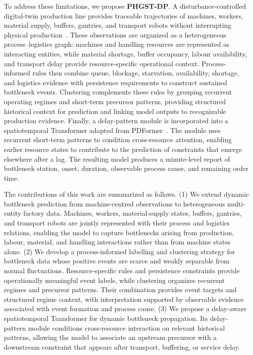 \documentclass[a4paper,fleqn]{cas-dc}
\begin{document}
To address these limitations, we propose \textbf{PHGST-DP}. A disturbance-controlled digital-twin production line provides traceable trajectories of machines, workers, material supply, buffers, gantries, and transport robots without interrupting physical production~\cite{lu2020digital,isaacsim2026,xue2026safe}. These observations are organized as a heterogeneous process--logistics graph: machines and handling resources are represented as interacting entities, while material shortage, buffer occupancy, labour availability, and transport delay provide resource-specific operational context. Process-informed rules then combine queue, blockage, starvation, availability, shortage, and logistics evidence with persistence requirements to construct sustained bottleneck events. Clustering complements these rules by grouping recurrent operating regimes and short-term precursor patterns, providing structured historical context for prediction and linking model outputs to recognizable production evidence. Finally, a delay-pattern module is incorporated into a spatiotemporal Transformer adapted from PDFormer~\cite{jiang2023pdformer}. The module uses recurrent short-term patterns to condition cross-resource attention, enabling earlier resource states to contribute to the prediction of constraints that emerge elsewhere after a lag. The resulting model produces a minute-level report of bottleneck station, onset, duration, observable process cause, and remaining order time.


The contributions of this work are summarized as follows. (1) We extend dynamic bottleneck prediction from machine-centred observations to heterogeneous multi-entity factory data. Machines, workers, material-supply states, buffers, gantries, and transport robots are jointly represented with their process and logistics relations, enabling the model to capture bottlenecks arising from production, labour, material, and handling interactions rather than from machine states alone. (2) We develop a process-informed labelling and clustering strategy for bottleneck data whose positive events are scarce and weakly separable from normal fluctuations. Resource-specific rules and persistence constraints provide operationally meaningful event labels, while clustering organizes recurrent regimes and precursor patterns. Their combination provides event targets and structured regime context, with interpretation supported by observable evidence associated with event formation and process cause. (3) We propose a delay-aware spatiotemporal Transformer for dynamic bottleneck propagation. Its delay-pattern module conditions cross-resource interaction on relevant historical patterns, allowing the model to associate an upstream precursor with a downstream constraint that appears after transport, buffering, or service delay.
\end{document}
